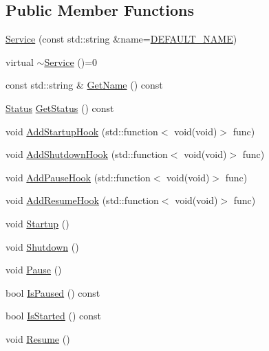 \subsection*{Public Member Functions}
\begin{DoxyCompactItemize}
\item 
\hyperlink{classastu_1_1Service_a152543ef7853c19f6e1ea8cfee293edf}{Service} (const std\+::string \&name=\hyperlink{classastu_1_1Service_a8bb66bb984aa9490026232b193896634}{D\+E\+F\+A\+U\+L\+T\+\_\+\+N\+A\+ME})
\item 
virtual \hyperlink{classastu_1_1Service_aa5b2642db2ba704a5a33d0ec7735cfca}{$\sim$\+Service} ()=0
\item 
const std\+::string \& \hyperlink{classastu_1_1Service_afa9933498d88c92b649a551d341e657a}{Get\+Name} () const
\item 
\hyperlink{classastu_1_1Service_a5ef3b0bb1fb8a504afe708ee4dd8371e}{Status} \hyperlink{classastu_1_1Service_a1b4764263b2e7417a6e0ad3bc4f4950a}{Get\+Status} () const
\item 
void \hyperlink{classastu_1_1Service_a8a4a5e418992839d78a2062ad9ecb288}{Add\+Startup\+Hook} (std\+::function$<$ void(void)$>$ func)
\item 
void \hyperlink{classastu_1_1Service_afd15c531e0298f898192f4a1cdfa2a2d}{Add\+Shutdown\+Hook} (std\+::function$<$ void(void)$>$ func)
\item 
void \hyperlink{classastu_1_1Service_a362265b0bb1d26f9a18c882a9c6985bb}{Add\+Pause\+Hook} (std\+::function$<$ void(void)$>$ func)
\item 
void \hyperlink{classastu_1_1Service_a5c7ab8ad94185d1a30e04a84afbfa6c6}{Add\+Resume\+Hook} (std\+::function$<$ void(void)$>$ func)
\item 
void \hyperlink{classastu_1_1Service_ab52f8c56e0d3081a704e22ae2a8c5c7e}{Startup} ()
\item 
void \hyperlink{classastu_1_1Service_ada193e446024b2ac886ba2954cd5d3b3}{Shutdown} ()
\item 
void \hyperlink{classastu_1_1Service_a818001c0eea6dbde944c2aa28c206c99}{Pause} ()
\item 
bool \hyperlink{classastu_1_1Service_a307be9a1bff02c13431ec5edcc777f97}{Is\+Paused} () const
\item 
bool \hyperlink{classastu_1_1Service_a55a5c6e1584aca9c8f02364f84bb325e}{Is\+Started} () const
\item 
void \hyperlink{classastu_1_1Service_a5e90531095fddccdc48648c7ce5ebe70}{Resume} ()
\end{DoxyCompactItemize}

